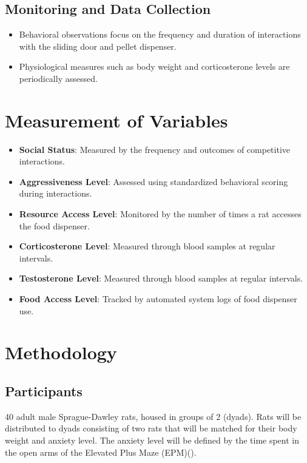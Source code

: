 \documentclass[english, a4paper, 11pt]{article}
\begin{document}
\subsection*{Monitoring and Data Collection}
\begin{itemize}
    \item Behavioral observations focus on the frequency and duration of interactions with the sliding door and pellet dispenser.
    \item Physiological measures such as body weight and corticosterone levels are periodically assessed.
\end{itemize}

\section*{Measurement of Variables}

\begin{itemize}
    \item \textbf{Social Status}: Measured by the frequency and outcomes of competitive interactions.
    \item \textbf{Aggressiveness Level}: Assessed using standardized behavioral scoring during interactions.
    \item \textbf{Resource Access Level}: Monitored by the number of times a rat accesses the food dispenser.
    \item \textbf{Corticosterone Level}: Measured through blood samples at regular intervals.
    \item \textbf{Testosterone Level}: Measured through blood samples at regular intervals.
    \item \textbf{Food Access Level}: Tracked by automated system logs of food dispenser use.
\end{itemize}

\section*{Methodology}
\subsection*{Participants}
40 adult male Sprague-Dawley rats, housed in groups of 2 (dyads). Rats will be distributed to dyads consisting of two rats that will be matched for their body weight and anxiety level. The anxiety level will be defined by the time spent in the open arms of the Elevated Plus Maze (EPM)(\cite{herreroIndividualDifferencesAnxiety2006,timmerEvidenceRoleOxytocin2011}).
\end{document}
